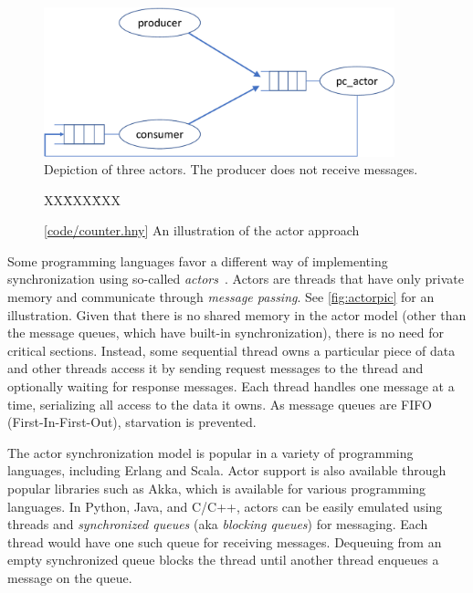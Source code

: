 \documentclass{report}
\newcommand{\harmonysource}[1]{
\begin{tabbing}
XX\=XXX\=XXX\kill
    
\end{tabbing}
}
\newcommand{\harmonylink}[1]{%
[\href{https://harmony.cs.cornell.edu/#1}{\underline{#1}}]%
}
\newenvironment{code}{
\tcolorbox
}{
\endtcolorbox
}
\begin{document}
\begin{figure}
\begin{center}
\includegraphics[width=4in]{figures/actor-crop.pdf}
\end{center}
\caption{Depiction of three actors.  The producer does not receive messages.}
\label{fig:actorpic}
\end{figure}

\begin{figure}
\begin{code}
\harmonysource{counter}
\end{code}
\caption{\harmonylink{code/counter.hny} An illustration of the actor approach}
\label{fig:actor}
\end{figure}

Some programming languages favor a different way of implementing
synchronization using so-called \emph{actors}~\cite{HBS73,Agha86}.  Actors are
threads that have only private memory and communicate through
\emph{message passing}.
See \autoref{fig:actorpic} for an illustration.
Given that there is no shared memory in the actor model (other than the message
queues, which have built-in synchronization), there is no need
for critical sections.  Instead, some sequential thread owns a particular
piece of data and other threads access it by sending request messages
to the thread and optionally waiting for response messages.  Each thread
handles one message at a time, serializing all access to the data it owns.
As message queues are FIFO (First-In-First-Out), starvation is prevented.

The actor synchronization model is popular in a variety of programming
languages, including Erlang and Scala.  Actor support is also available
through popular libraries such as Akka, which is available for various
programming languages.  In Python, Java, and C/C++,
actors can be easily emulated using threads and \emph{synchronized queues}
%
(aka \emph{blocking queues})
%
for messaging.
Each thread would have one such queue for receiving messages.
Dequeuing from an empty synchronized queue blocks the thread until
another thread enqueues a message on the queue.
\end{document}
